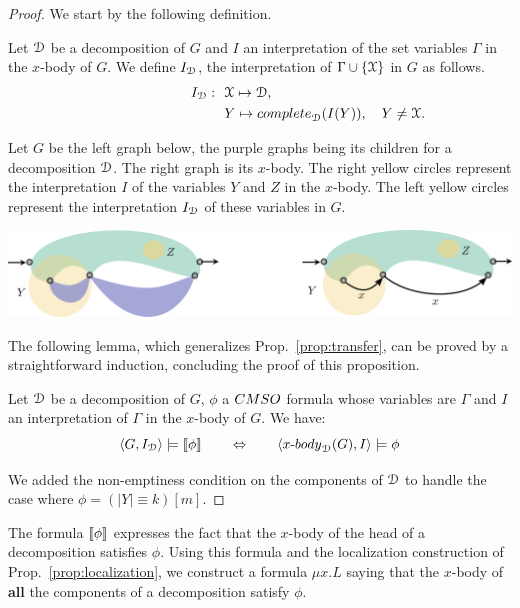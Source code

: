 \begin{proof} We start by the following definition.
\begin{definition} Let  $\mathcal D$ be a decomposition of  $G$ and $I$  an interpretation of the  set variables $\Gamma$ in  the $x$-body of $G$. We define $I_\mathcal D$, the interpretation of $\Gamma\cup\left\{\mathcal X\right\}$ in  $G$ as follows.
\begin{align*}
\qquad\qquad \qquad \quad I_\cD:\ \ & \cX \mapsto \cD, \\
      &   Y \mapsto \mathsf{complete}_\cD(I(Y)), \quad Y\neq \cX.
\end{align*} 
\end{definition}
Let $G$ be the left graph below, the purple graphs being its children for a decomposition $\mathcal D$. The right graph is its $x$-body. The right yellow circles represent the interpretation $I$ of the variables $Y$ and $Z$ in the $x$-body. The left yellow circles represent the interpretation $I_\mathcal D$ of these variables in $G$. 
\begin{center}
\includegraphics[scale=.12]{Pictures/transfer-interpretation}
\end{center}
The following lemma, which generalizes Prop.~\ref{prop:transfer}, can be proved by a straightforward induction, concluding the proof of this proposition.
 \begin{lemma}
 Let $\mathcal D$ be a decomposition of $G$, $\phi$ a $\CMSO$ formula whose variables are $\Gamma$ and $I$ an interpretation of  $\Gamma$ in the $x$-body of $G$. We have:
 $$ \langle G, I_\cD\rangle \models \tms{\phi} \qquad \Leftrightarrow \qquad\langle x\text{-}\mathsf{body}_\cD(G), I\rangle \models \phi$$ 
 \end{lemma}
We added the non-emptiness condition on the components of $\mathcal D$ to handle the case where $\phi=(|Y|\equiv k)[m]$.
 \end{proof}

The formula  $\left\llbracket {\phi}\right\rrbracket$ expresses the fact that the $x$-body of the head of a decomposition satisfies $\phi$. Using this formula and the localization construction of Prop.~\ref{prop:localization}, we construct a formula $\mu x. L$ saying that the $x$-body of \textbf{all} the components of a decomposition satisfy $\phi$.

